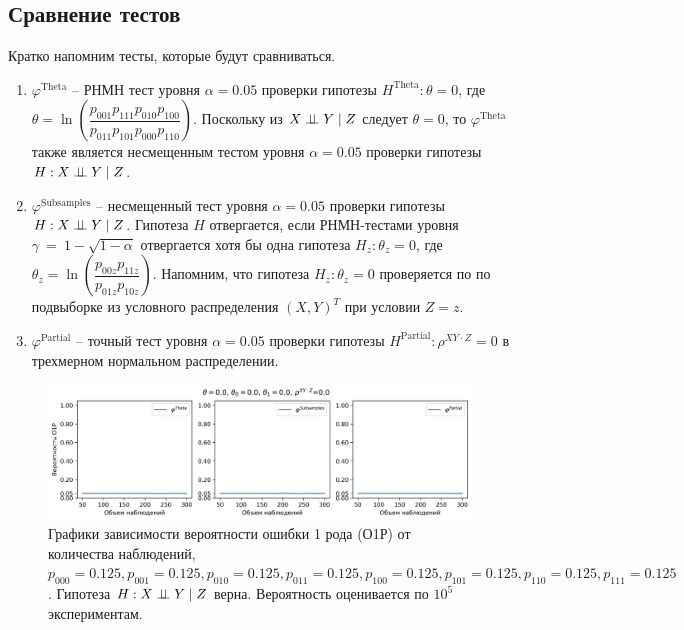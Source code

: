 \newpage
\subsection{Сравнение тестов}\label{numerical_exp}

Кратко напомним тесты, которые будут сравниваться.
\begin{enumerate}
    \item $\varphi^{\text{Theta}}$ -- РНМН тест уровня 
    $\alpha=0.05$ проверки гипотезы
    $H^{\text{Theta}}: \theta=0$, где
     $\theta = \ln  \left(\dfrac{p_{001}p_{111}p_{010}p_{100}}{p_{011}p_{101}p_{000}p_{110}}\right)$.
    Поскольку из $X \perp\!\!\!\perp Y \mid Z$ следует $\theta=0$, 
    то $\varphi^{\text{Theta}}$ также является несмещенным тестом уровня $\alpha=0.05$ проверки
    гипотезы $H:X \perp\!\!\!\perp Y \mid Z$.
    \item $\varphi^{\text{Subsamples}}$ -- несмещенный тест уровня $\alpha=0.05$
    проверки гипотезы $H: X \perp\!\!\!\perp Y \mid Z$.
    Гипотеза $H$ отвергается, если РНМН-тестами уровня 
    $\gamma~=~1-\sqrt{1-\alpha}$
    отвергается хотя бы 
    одна гипотеза $H_z: \theta_z=0$, где
    $\theta_z = \ln\left(\dfrac{p_{00z}p_{11z}}{p_{01z}p_{10z}}\right)$.
    Напомним, что гипотеза $H_z: \theta_z=0$ проверяется по 
    по подвыборке из условного распределения $(X,Y)^T$ при условии $Z=z$.
    \item $\varphi^{\text{Partial}}$ -- точный тест уровня $\alpha=0.05$
    проверки гипотезы $H^{\text{Partial}}: \rho^{XY\cdot Z}=0$ в трехмерном нормальном распределении.
\end{enumerate}

\begin{figure}[H]
    \centering
    \includegraphics[scale=0.5]{images/graph1.png}
    \caption{Графики зависимости вероятности ошибки 1 рода (О1Р) от количества наблюдений,
     $p_{000}=0.125, p_{001}=0.125, p_{010}=0.125, p_{011}=0.125,
    p_{100}=0.125, p_{101}=0.125, p_{110}=0.125, p_{111}=0.125$. 
    Гипотеза $H: X \perp\!\!\!\perp Y \mid Z$ верна.
    Вероятность оценивается по $10^5$ экспериментам.} \label{fig:1}
\end{figure}
    

